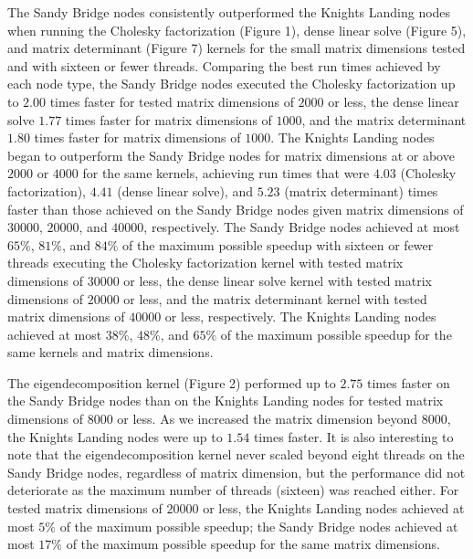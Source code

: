%
%
%
The Sandy Bridge nodes consistently outperformed the Knights Landing nodes when
  running the Cholesky factorization (Figure 1), dense linear solve (Figure 5),
  and matrix determinant (Figure 7) kernels for the small matrix dimensions
  tested and with sixteen or fewer threads.
Comparing the best run times achieved by each node type, the Sandy Bridge nodes
  executed the Cholesky factorization up to $2.00$ times faster for tested
  matrix dimensions of $2000$ or less, the dense linear solve $1.77$ times
  faster for matrix dimensions of $1000$, and the matrix determinant $1.80$
  times faster for matrix dimensions of $1000$.
The Knights Landing nodes began to outperform the Sandy Bridge nodes for matrix
  dimensions at or above $2000$ or $4000$ for the same kernels, achieving run
  times that were $4.03$ (Cholesky factorization), $4.41$ (dense linear solve),
  and $5.23$ (matrix determinant) times faster than those achieved on the Sandy
  Bridge nodes given matrix dimensions of $30000$, $20000$, and $40000$,
  respectively.
The Sandy Bridge nodes achieved at most $65\%$, $81\%$, and $84\%$ of the
  maximum possible speedup with sixteen or fewer threads executing the Cholesky
  factorization kernel with tested matrix dimensions of $30000$ or less, the
  dense linear solve kernel with tested matrix dimensions of $20000$ or less,
  and the matrix determinant kernel with tested matrix dimensions of $40000$ or
  less, respectively.
The Knights Landing nodes achieved at most $38\%$, $48\%$, and $65\%$ of the
  maximum possible speedup for the same kernels and matrix dimensions.

The eigendecomposition kernel (Figure 2) performed up to $2.75$ times faster on
  the Sandy Bridge nodes than on the Knights Landing nodes for tested matrix
  dimensions of $8000$ or less.
As we increased the matrix dimension beyond $8000$, the Knights Landing nodes
  were up to $1.54$ times faster.
It is also interesting to note that the eigendecomposition kernel never scaled
  beyond eight threads on the Sandy Bridge nodes, regardless of matrix
  dimension, but the performance did not deteriorate as the maximum number of
  threads (sixteen) was reached either.
For tested matrix dimensions of $20000$ or less, the Knights Landing nodes
  achieved at most $5\%$ of the maximum possible speedup; the Sandy Bridge
  nodes achieved at most $17\%$ of the maximum possible speedup for the same
  matrix dimensions.

